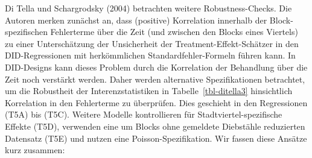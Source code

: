 \documentclass[
  a4paper,
  DIV=11,
  oneside]{scrreprt}
\begin{document}
Di Tella und Schargrodsky (2004) betrachten weitere Robustness-Checks.
Die Autoren merken zunächst an, dass (positive) Korrelation innerhalb
der Block-spezifischen Fehlerterme über die Zeit (und zwischen den
Blocks eines Viertels) zu einer Unterschätzung der Unsicherheit der
Treatment-Effekt-Schätzer in den DID-Regressionen mit herkömmlichen
Standardfehler-Formeln führen kann. In DID-Designs kann dieses Problem
durch die Korrelation der Behandlung über die Zeit noch verstärkt
werden. Daher werden alternative Spezifikationen betrachtet, um die
Robustheit der Interenzstatistiken in Tabelle~\ref{tbl-ditella3}
hinsichtlich Korrelation in den Fehlerterme zu überprüfen. Dies
geschieht in den Regressionen (T5A) bis (T5C). Weitere Modelle
kontrollieren für Stadtviertel-spezifische Effekte (T5D), verwenden eine
um Blocks ohne gemeldete Diebstähle reduzierten Datensatz (T5E) und
nutzen eine Poisson-Spezifikation. Wir fassen diese Ansätze kurz
zusammen:
\end{document}

